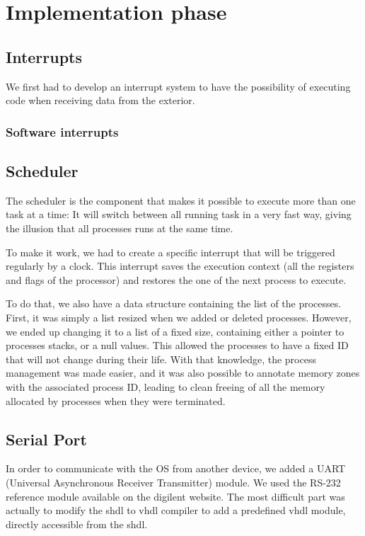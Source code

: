 \documentclass[openany, a4paper]{book}
\begin{document}
  \chapter{Implementation phase}
    \section{Interrupts}
      We first had to develop an interrupt system to have the possibility of
      executing code when receiving data from the exterior.

      \subsection{Software interrupts}

    \section{Scheduler}
      The scheduler is the component that makes it possible to execute more than
      one task at a time: It will switch between all running task in a very fast
      way, giving the illusion that all processes runs at the same time.

      To make it work, we had to create a specific interrupt that will be
      triggered regularly by a clock. This interrupt saves the execution
      context (all the registers and flags of the processor) and restores the
      one of the next process to execute.

      To do that, we also have a data structure containing the list of the
      processes. First, it was simply a list resized when we added or deleted
      processes. However, we ended up changing it to a list of a fixed size,
      containing either a pointer to processes stacks, or a null values.
      This allowed the processes to have a fixed ID that will not change during
      their life. With that knowledge, the process management was made
      easier, and it was also possible to annotate memory zones with the
      associated process ID, leading to clean freeing of all the memory
      allocated by processes when they were terminated.

    \section{Serial Port}
      In order to communicate with the OS from another device, we added a UART 
      (Universal Asynchronous Receiver Transmitter) module. We used the RS-232
      reference module available on the digilent website. The most difficult
      part was actually to modify the shdl to vhdl compiler to add a predefined
      vhdl module, directly accessible from the shdl.
\end{document}
